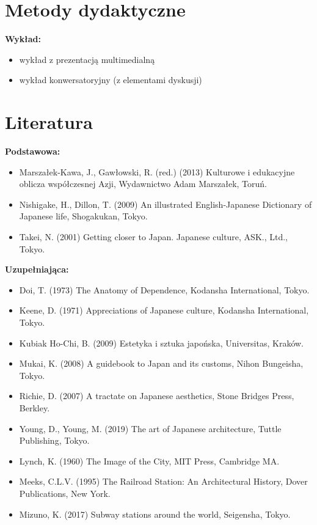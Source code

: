 \documentclass[12pt, a4paper]{article}
\begin{document}
\section{Metody dydaktyczne}

\textbf{Wykład:}
\begin{itemize}
  \item wykład z prezentacją multimedialną
  \item wykład konwersatoryjny (z elementami dyskusji)
\end{itemize}
\vspace{4pt}


\section{Literatura}

\textbf{Podstawowa:}
\begin{itemize}
  \item Marszałek-Kawa, J., Gawłowski, R. (red.) (2013) Kulturowe i edukacyjne oblicza współczesnej Azji, Wydawnictwo Adam Marszałek, Toruń.
  \item Nishigake, H., Dillon, T. (2009) An illustrated English-Japanese Dictionary of Japanese life, Shogakukan, Tokyo.
  \item Takei, N. (2001) Getting closer to Japan. Japanese culture, ASK., Ltd., Tokyo.
\end{itemize}

\textbf{Uzupełniająca:}
\begin{itemize}
  \item Doi, T. (1973) The Anatomy of Dependence, Kodansha International, Tokyo.
  \item Keene, D. (1971) Appreciations of Japanese culture, Kodansha International, Tokyo.
  \item Kubiak Ho-Chi, B. (2009) Estetyka i sztuka japońska, Universitas, Kraków.
  \item Mukai, K. (2008) A guidebook to Japan and its customs, Nihon Bungeisha, Tokyo.
  \item Richie, D. (2007) A tractate on Japanese aesthetics, Stone Bridges Press, Berkley.
  \item Young, D., Young, M. (2019) The art of Japanese architecture, Tuttle Publishing, Tokyo.
  \item Lynch, K. (1960) The Image of the City, MIT Press, Cambridge MA.
  \item Meeks, C.L.V. (1995) The Railroad Station: An Architectural History, Dover Publications, New York.
  \item Mizuno, K. (2017) Subway stations around the world, Seigensha, Tokyo.
\end{itemize}
\end{document}
